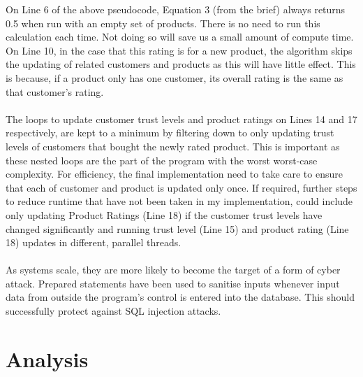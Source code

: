 \documentclass{article}
\begin{document}
On Line 6 of the above pseudocode, Equation 3 (from the brief) always returns 0.5 when run with an empty set of products. There is no need to run this calculation each time. Not doing so will save us a small amount of compute time. On Line 10, in the case that this rating is for a new product, the algorithm skips the updating of related customers and products as this will have little effect. This is because, if a product only has one customer, its overall rating is the same as that customer's rating.
\\\\
The loops to update customer trust levels and product ratings on Lines 14 and 17 respectively, are kept to a minimum by filtering down to only updating trust levels of customers that bought the newly rated product. This is important as these nested loops are the part of the program with the worst worst-case complexity. For efficiency, the final implementation need to take care to ensure that each of customer and product is updated only once. If required, further steps to reduce runtime that have not been taken in my implementation, could include only updating Product Ratings (Line 18) if the customer trust levels have changed significantly and running trust level (Line 15) and product rating (Line 18) updates in different, parallel threads.
\\\\
As systems scale, they are more likely to become the target of a form of cyber attack. Prepared statements have been used to sanitise inputs whenever input data from outside the program's control is entered into the database. This should successfully protect against SQL injection attacks.

\section{Analysis} %
\label{analysis}
\end{document}
